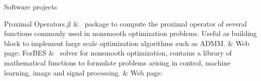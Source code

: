 \begin{cvsection}{Software projects \subtitle{GitHub: \mygithub}}
Proximal Operators.jl		& \ package to compute the proximal operator of several functions commonly used in nonsmooth optimization problems. Useful as building block to implement large scale optimization algorithms such as ADMM. \spacednewline
			& Web page: \href{https://github.com/kul-forbes/ProximalOperators.jl}{}\spacednewline
ForBES		& \ solver for nonsmooth optimization, contains a library of mathematical functions to formulate problems arising in control, machine learning, image and signal processing.\spacednewline
			& Web page: \href{https://kul-forbes.github.io/ForBES}{} \spacednewline
\end{cvsection}
